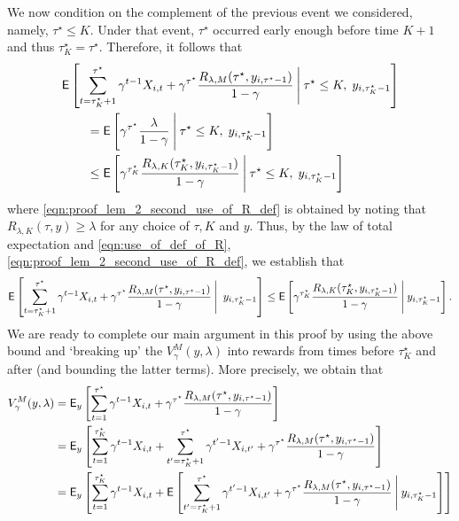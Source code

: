 \begin{myproof}[Proof.]
	We now condition on the complement of the previous event we considered, namely, $\tau^\star \le K$. Under that event, $\tau^\star$ occurred early enough before time $K+1$ and thus $\tau^\star_K = \tau^\star$. Therefore, it follows that
	\begin{align} 
	&\E\left[\sum_{t=\tau_K^\star+1}^{\tau^\star}\gamma^{t-1} X_{i,t} + \gamma^{\tau^\star} \frac{R_{\lambda,M}(\tau^\star, y_{i,\tau^\star-1})}{1-\gamma}
	\given[\Bigg] \tau^\star \le K, \;y_{i,\tau^\star_K-1} \right] \nonumber  \\
	&\qquad = \E\left[\gamma^{\tau^\star}  \frac{\lambda}{1-\gamma}
	\given[\Bigg]\tau^\star \le K, \; y_{i,\tau^\star_K-1} \right] \nonumber \\
	&\qquad \le \E\left[\gamma^{\tau^\star_K}  \frac{R_{\lambda,K}(\tau^\star_K, y_{i,\tau^\star_K-1})}{1-\gamma}
	\given[\Bigg]\tau^\star \le K, \; y_{i,\tau^\star_K-1} \right] \label{eqn:proof_lem_2_second_use_of_R_def}
	\end{align}
	where \eqref{eqn:proof_lem_2_second_use_of_R_def} is obtained by noting that $R_{\lambda,K}(\tau, y) \ge \lambda$ for any choice of $\tau, K$ and $y$. Thus, by the law of total expectation and \eqref{eqn:use_of_def_of_R}, \eqref{eqn:proof_lem_2_second_use_of_R_def}, we establish that
	\begin{equation} \label{ineq:proof_lem_2_main_bound_in_proof}
	\E\left[\sum_{t=\tau_K^\star+1}^{\tau^\star}\gamma^{t-1} X_{i,t} + \gamma^{\tau^\star} \frac{R_{\lambda,M}(\tau^\star, y_{i,\tau^\star-1})}{1-\gamma}
	\given[\Bigg] \;y_{i,\tau^\star_K-1} \right] \le \Ee{\gamma^{\tau^\star_K}  \frac{R_{\lambda,K}(\tau^\star_K, y_{i,\tau^\star_K-1})}{1-\gamma} \given[\Bigg] y_{i,\tau^\star_K-1}}.
	\end{equation}
	We are ready to complete our main argument in this proof by using the above bound and `breaking up' the $V_\gamma^M(y, \lambda)$ into rewards from times before $\tau_K^\star$ and after (and bounding the latter terms). More precisely, we obtain that
	\begin{align}
	V_\gamma^M(y,\lambda) & = \E_{y}\left[\sum_{t=1}^{\tau^\star}\gamma^{t-1} X_{i,t} + \gamma^{\tau^\star}\frac{R_{\lambda,M}(\tau^\star, y_{i,\tau^\star-1})}{1-\gamma}\right] \\
	& = \E_{y}\left[\sum_{t=1}^{\tau^\star_K}\gamma^{t-1} X_{i,t} + \sum_{t'=\tau^\star_K+1}^{\tau^\star}\gamma^{t'-1} X_{i,t'} +  \gamma^{\tau^\star}\frac{R_{\lambda,M}(\tau^\star, y_{i,\tau^\star-1})}{1-\gamma}\right] \nonumber \\
	& = \E_{y}\left[\sum_{t=1}^{\tau^\star_K}\gamma^{t-1} X_{i,t} + \Ee{\sum_{t'=\tau^\star_K+1}^{\tau^\star}\gamma^{t'-1} X_{i,t'} +  \gamma^{\tau^\star}\frac{R_{\lambda,M}(\tau^\star, y_{i,\tau^\star-1})}{1-\gamma} \given[\Bigg] y_{i,\tau^\star_K-1} }\right] \label{eqn:proof_lem_2_tower_prop_again} \\

\end{align}
\end{myproof}
